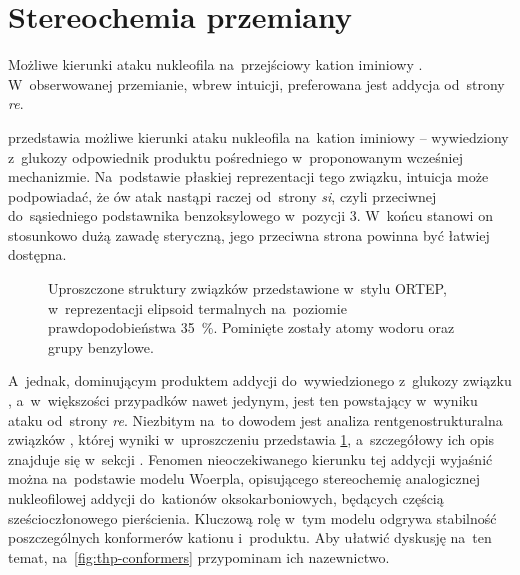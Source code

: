 \section{Stereochemia przemiany}\label{numeric:stereo}

\begin{marginfigure}[10\baselineskip]
  
  \caption{
    Możliwe kierunki ataku nukleofila na~przejściowy kation iminiowy .
    W~obserwowanej przemianie, wbrew intuicji, preferowana jest addycja od~strony \textit{re}.
  }\label{fig:direction}
\end{marginfigure}

 przedstawia możliwe kierunki ataku nukleofila na~kation iminiowy
   \--- wywiedziony z~glukozy odpowiednik produktu pośredniego 
  w~proponowanym wcześniej mechanizmie.
Na~podstawie płaskiej reprezentacji tego związku, intuicja może podpowiadać, że ów atak
  nastąpi raczej od~strony \textit{si}, czyli przeciwnej do~sąsiedniego podstawnika
  benzoksylowego w~pozycji 3.
W~końcu stanowi on stosunkowo dużą zawadę steryczną, jego przeciwna strona powinna być
  łatwiej dostępna.

\begin{figure}
  
  \caption{
    Uproszczone struktury związków  przedstawione
      w~stylu ORTEP, w~reprezentacji elipsoid termalnych na~poziomie prawdopodobieństwa
      \SI{35}{\percent}.
    Pominięte zostały atomy wodoru oraz grupy benzylowe.
  }\label{fig:xray}
\end{figure}

A~jednak, dominującym produktem addycji do~wywiedzionego z~glukozy związku ,
  a~w~większości przypadków nawet jedynym, jest ten powstający w~wyniku ataku od~strony \textit{re}.
Niezbitym na~to dowodem jest analiza rentgenostrukturalna związków
  , której wyniki w~uproszczeniu przedstawia \cref{fig:xray},
  a~szczegółowy ich opis znajduje się w~sekcji .
Fenomen nieoczekiwanego kierunku tej addycji wyjaśnić można na~podstawie modelu Woerpla,
  opisującego stereochemię analogicznej nukleofilowej addycji do~kationów oksokarboniowych,
  będących częścią sześcioczłonowego pierścienia.
Kluczową rolę w~tym modelu odgrywa stabilność poszczególnych konformerów kationu i~produktu.
Aby ułatwić dyskusję na~ten temat,
  na~\cref{fig:thp-conformers} przypominam ich nazewnictwo.

